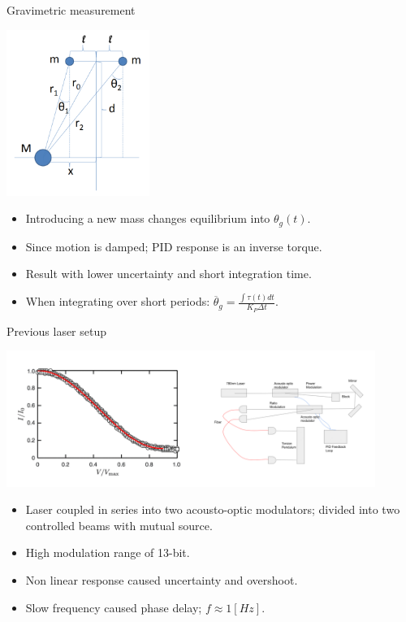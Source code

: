 \documentclass{beamer}
\begin{document}
\begin{frame}{\hypertarget{frame:Gravimetric measurement}{Gravimetric measurement}}
	\begin{center}		
		\includegraphics[width=0.35\textwidth,keepaspectratio]{Cavendish apparatus.PNG}
    \end{center}
	\begin{itemize}
		
		\item Introducing a new mass changes equilibrium into $\theta_g(t)$. 
		\item Since motion is damped; PID response is an inverse torque. 
		\item Result with lower uncertainty and short integration time.
		\item When integrating over short periods: $\overline{\theta}_g =  \frac{\int \tau(t) dt}{ K_P \Delta t} $. 	

	\end{itemize}
\end{frame}


\begin{frame}{Previous laser setup}
	\begin{center}		
		\includegraphics[width=0.9\textwidth,keepaspectratio]{aom2.png}
	\end{center}
	\begin{itemize}		
		\item Laser coupled in series into two acousto-optic modulators; divided into two controlled beams with mutual source.
		\item High modulation range of 13-bit.
		\item Non linear response caused uncertainty and overshoot.
		\item Slow frequency caused phase delay; $f \approx 1 [Hz]$.
	\end{itemize}
\end{frame}
\end{document}
